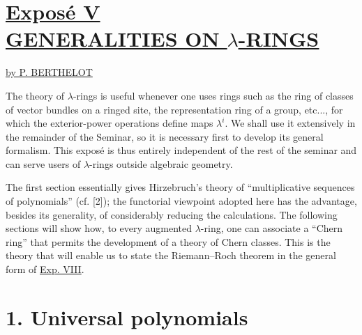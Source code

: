 %
\renewcommand{\parf}{\operatorname{parf}}
\section*{\underline{Exposé V}\\[3pt] \underline{\underline{GENERALITIES ON \(\lambda\)-RINGS}}}
\begin{center}
\underline{by P. BERTHELOT}
\end{center}

The theory of \(\lambda\)-rings is useful whenever one uses rings such as the ring of classes of vector bundles on a ringed site, the representation ring of a group, etc..., for which the exterior-power operations define maps \(\lambda^i\). We shall use it extensively in the remainder of the Seminar, so it is necessary first to develop its general formalism. This exposé is thus entirely independent of the rest of the seminar and can serve users of \(\lambda\)-rings outside algebraic geometry.

The first section essentially gives Hirzebruch's theory of ``multiplicative sequences of polynomials'' (cf. [2]); the functorial viewpoint adopted here has the advantage, besides its generality, of considerably reducing the calculations. The following sections will show how, to every augmented \(\lambda\)-ring, one can associate a ``Chern ring'' that permits the development of a theory of Chern classes. This is the theory that will enable us to state the Riemann--Roch theorem in the general form of \hyperlink{sga6.e08.expose}{Exp. VIII}.

\section*{1. Universal polynomials}

